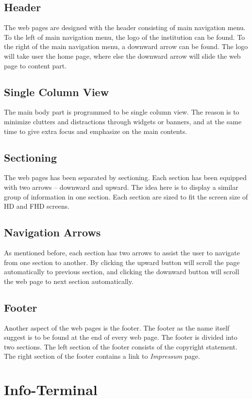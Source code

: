 \subsection*{Header}
The web pages are designed with the header consisting of main navigation menu. To the left of main navigation menu, the logo of the institution can be found. To the right of the main navigation menu, a downward arrow can be found. The logo will take user the home page, where else the downward arrow will slide the web page to content part.

\subsection*{Single Column View}
The main body part is programmed to be single column view. The reason is to minimize clutters and distractions through widgets or banners, and at the same time to give extra focus and emphasize on the main contents.

\subsection*{Sectioning}
The web pages has been separated by sectioning. Each section has been equipped with two arrows -- downward and upward. The idea here is  to display a similar group of information in one section. Each section are sized to fit the screen size of HD and FHD screens.

\subsection*{Navigation Arrows}
As mentioned before, each section has two arrows to assist the user to navigate from one section to another. By clicking the upward button will scroll the page automatically to previous section, and clicking the downward button will scroll the web page to next section automatically.

\subsection*{Footer}
Another aspect of the web pages is the footer. The footer as the name itself suggest is to be found at the end of every web page. The footer is divided into two sections. The left section of the footer consists of the copyright statement. The right section of the footer contains a link to \emph{Impressum} page.

\section{Info-Terminal}
